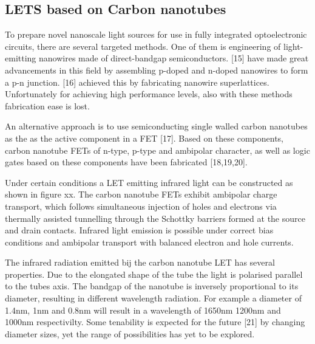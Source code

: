 \subsection{LETS based on Carbon nanotubes} %

To prepare novel nanoscale light sources for use in fully integrated optoelectronic circuits, there are several targeted methods. One of them is engineering of light-emitting nanowires made of direct-bandgap semiconductors. [15] have made great advancements in this field by assembling p-doped and n-doped nanowires to form a p-n junction. [16] achieved this by fabricating nanowire superlattices. Unfortunately for achieving high performance levels, also with these methods fabrication ease is lost. 

An alternative approach is to use semiconducting single walled carbon nanotubes as the as the active component in a FET [17]. Based on these components, carbon nanotube FETs of n-type, p-type and ambipolar character, as well as logic gates based on these components have been fabricated [18,19,20].

Under certain conditions a LET emitting infrared light can be constructed as shown in figure xx. The carbon nanotube FETs exhibit ambipolar charge transport, which follows simultaneous injection of holes and electrons via thermally assisted tunnelling through the Schottky barriers formed at the source and drain contacts. Infrared light emission is possible under correct bias conditions and ambipolar transport with balanced electron and hole currents.

The infrared radiation emitted bij the carbon nanotube LET has several properties. Due to the elongated shape of the tube the light is polarised parallel to the tubes axis. The bandgap of the nanotube is inversely proportional to its diameter, resulting in different wavelength radiation. For example a diameter of 1.4nm, 1nm and 0.8nm will result in a wavelength of 1650nm 1200nm and 1000nm respectivilty. Some tenability is expected for the future [21] by changing diameter sizes, yet the range of possibilities has yet to be explored.
